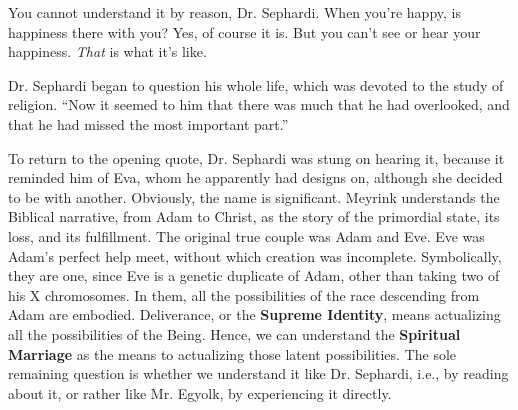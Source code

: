 \begin{quotex}
You cannot understand it by reason, Dr. Sephardi. When you're happy, is happiness there with you? Yes, of course it is. But you can't see or hear your happiness. \emph{That} is what it's like.
\end{quotex}

Dr. Sephardi began to question his whole life, which was devoted to the study of religion. ``Now it seemed to him that there was much that he had overlooked, and that he had missed the most important part.''

To return to the opening quote, Dr. Sephardi was stung on hearing it, because it reminded him of Eva, whom he apparently had designs on, although she decided to be with another. Obviously, the name is significant. Meyrink understands the Biblical narrative, from Adam to Christ, as the story of the primordial state, its loss, and its fulfillment. The original true couple was Adam and Eve. Eve was Adam's perfect help meet, without which creation was incomplete. Symbolically, they are one, since Eve is a genetic duplicate of Adam, other than taking two of his X chromosomes. In them, all the possibilities of the race descending from Adam are embodied. Deliverance, or the \textbf{Supreme Identity}, means actualizing all the possibilities of the Being. Hence, we can understand the \textbf{Spiritual Marriage} as the means to actualizing those latent possibilities. The sole remaining question is whether we understand it like Dr. Sephardi, i.e., by reading about it, or rather like Mr. Egyolk, by experiencing it directly.



